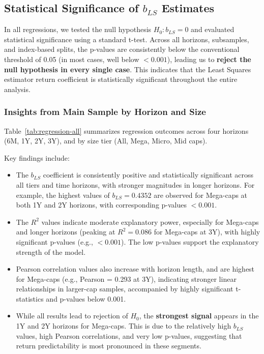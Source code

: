 \documentclass[11pt]{article}
\begin{document}
\subsection{Statistical Significance of $b_{LS}$ Estimates}

In all regressions, we tested the null hypothesis $H_0: b_{LS} = 0$ and evaluated statistical significance using a standard t-test. Across all horizons, subsamples, and index-based splits, the p-values are consistently below the conventional threshold of 0.05 (in most cases, well below $<0.001$), leading us to \textbf{reject the null hypothesis in every single case}. This indicates that the Least Squares estimator return coefficient is statistically significant throughout the entire analysis.

\subsubsection{Insights from Main Sample by Horizon and Size}

Table~\ref{tab:regression-all} summarizes regression outcomes across four horizons (6M, 1Y, 2Y, 3Y), and by size tier (All, Mega, Micro, Mid caps).

Key findings include:

\begin{itemize}
    \item The $b_{LS}$ coefficient is consistently positive and statistically significant across all tiers and time horizons, with stronger magnitudes in longer horizons. For example, the highest values of $b_{LS} = 0.4352$ are observed for Mega-caps at both 1Y and 2Y horizons, with corresponding p-values $<0.001$.
    
    \item The $R^2$ values indicate moderate explanatory power, especially for Mega-caps and longer horizons (peaking at $R^2 = 0.086$ for Mega-caps at 3Y), with highly significant p-values (e.g., $<0.001$). The low p-values support the explanatory strength of the model.

    \item Pearson correlation values also increase with horizon length, and are highest for Mega-caps (e.g., Pearson = 0.293 at 3Y), indicating stronger linear relationships in larger-cap samples, accompanied by highly significant t-statistics and p-values below 0.001.

    \item While all results lead to rejection of $H_0$, the \textbf{strongest signal} appears in the 1Y and 2Y horizons for Mega-caps. This is due to the relatively high $b_{LS}$ values, high Pearson correlations, and very low p-values, suggesting that return predictability is most pronounced in these segments.
\end{itemize}
\end{document}

